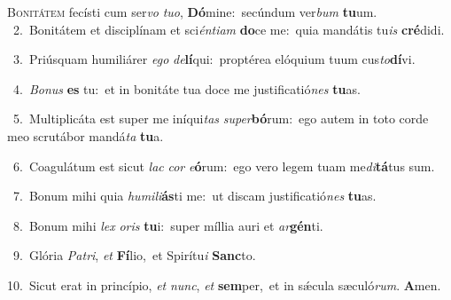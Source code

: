 \lettrine{\initial\textcolor{\initialcolor}{B}}{onitátem} fecísti cum ser\textit{vo} \textit{tu}\-\textit{o}, \textbf{Dó}\-mine:~\star secúndum ver\textit{bum} \textbf{tu}\-um.\\
{\numbfont\textcolor{\numbcolor}{~2.}}~Bonitátem et disciplínam et sci\-\textit{én}\-\textit{ti}\textit{am} \textbf{do}\-ce me:~\star quia mandátis tu\textit{is} \textbf{cré}\-didi.\par
{\numbfont\textcolor{\numbcolor}{~3.}}~Priúsquam humiliárer \textit{e}\-\textit{go} \textit{de}\-\textbf{lí}qui:~\star proptérea elóquium tuum cus\-\textit{to}\-\textbf{dí}vi.\par
{\numbfont\textcolor{\numbcolor}{~4.}}~\-\textit{Bo}\-\textit{nus} \textbf{es} tu:~\star et in bonitáte tua doce me justificatió\textit{nes} \textbf{tu}\-as.\par
{\numbfont\textcolor{\numbcolor}{~5.}}~Multiplicáta est super me iníqui\textit{tas} \textit{su}\-\textit{per}\textbf{bó}rum:~\star ego autem in toto corde meo scrutábor mandá\textit{ta} \textbf{tu}\-a.\par
{\numbfont\textcolor{\numbcolor}{~6.}}~Coagulátum est sicut \textit{lac} \textit{cor} \textit{e}\-\textbf{ó}rum:~\star ego vero legem tuam me\-\textit{di}\-\textbf{tá}tus sum.\par
{\numbfont\textcolor{\numbcolor}{~7.}}~Bonum mihi quia \textit{hu}\-\textit{mi}\textit{li}\textbf{ás}ti me:~\star ut discam justificatió\textit{nes} \textbf{tu}\-as.\par
{\numbfont\textcolor{\numbcolor}{~8.}}~Bonum mihi \textit{lex} \textit{o}\-\textit{ris} \textbf{tu}\-i:~\star super míllia auri et \textit{ar}\-\textbf{gén}ti.\par
{\numbfont\textcolor{\numbcolor}{~9.}}~Glória \textit{Pa}\-\textit{tri}, \textit{et} \textbf{Fí}\-lio,~\star et Spirítu\textit{i} \textbf{Sanc}\-to.\par
{\numbfont\textcolor{\numbcolor}{10.}}~Sicut erat in princípio, \textit{et} \textit{nunc}\-, \textit{et} \textbf{sem}\-per,~\star et in sǽcula sæculó\-\textit{rum}\-. \textbf{A}\-men.\par
